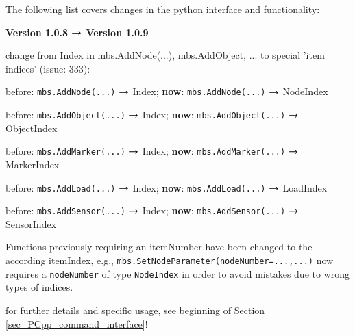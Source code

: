 The following list covers changes in the python interface and functionality:
\bi
	\item {\bf Version 1.0.8 $\rightarrow$ Version 1.0.9}
	\item[] change from Index in mbs.AddNode(...), mbs.AddObject, ... to special 'item indices' (issue: 333):
	\bi %
	\item before: \texttt{mbs.AddNode(...)} $\rightarrow$ Index; {\bf now}: \texttt{mbs.AddNode(...)} $\rightarrow$ NodeIndex
	\item before: \texttt{mbs.AddObject(...)} $\rightarrow$ Index; {\bf now}: \texttt{mbs.AddObject(...)} $\rightarrow$ ObjectIndex
	\item before: \texttt{mbs.AddMarker(...)} $\rightarrow$ Index; {\bf now}: \texttt{mbs.AddMarker(...)} $\rightarrow$ MarkerIndex
	\item before: \texttt{mbs.AddLoad(...)} $\rightarrow$ Index; {\bf now}: \texttt{mbs.AddLoad(...)} $\rightarrow$ LoadIndex
	\item before: \texttt{mbs.AddSensor(...)} $\rightarrow$ Index; {\bf now}: \texttt{mbs.AddSensor(...)} $\rightarrow$ SensorIndex
	\item Functions previously requiring an itemNumber have been changed to the according itemIndex, e.g., 
		\texttt{mbs.SetNodeParameter(nodeNumber=...,...)} now requires a \texttt{nodeNumber} of type \texttt{NodeIndex} in order
		to avoid mistakes due to wrong types of indices.
	\item for further details and specific usage, see beginning of Section \ref{sec_PCpp_command_interface}!
